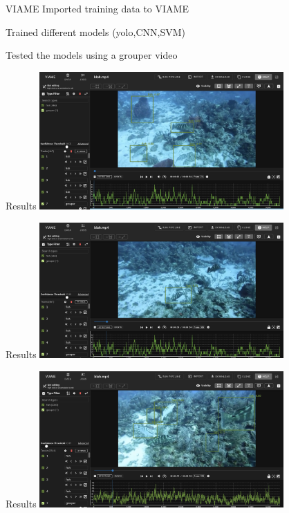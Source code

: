 \begin{frame}{VIAME}
    Imported training data to VIAME

    Trained different models (yolo,CNN,SVM)

    Tested the models using a grouper video

\end{frame}


\begin{frame}{Results}
    \centering
    \includegraphics[height=0.7\textheight,width=0.7\textwidth,keepaspectratio]{images/gm2-1.png}

\end{frame}

\begin{frame}{Results}
    \centering
    \includegraphics[height=0.7\textheight,width=0.7\textwidth,keepaspectratio]{images/gm2-2.png}

\end{frame}
\begin{frame}{Results}
    \centering
    \includegraphics[height=0.7\textheight,width=0.7\textwidth,keepaspectratio]{images/gm2-3.png}

\end{frame}

